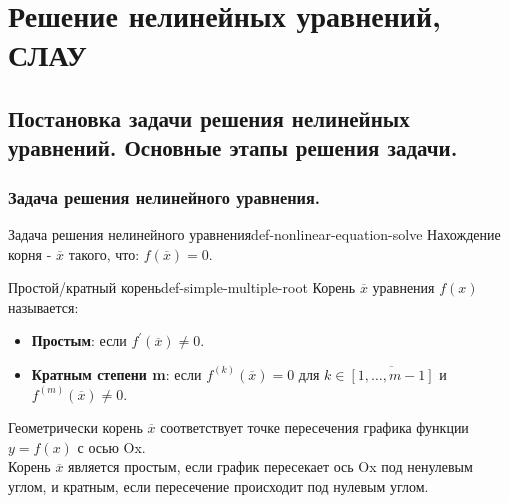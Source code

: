 \documentclass[14pt]{extarticle}
\begin{document}
\section{Решение нелинейных уравнений, СЛАУ}

\subsection{Постановка задачи решения нелинейных уравнений. Основные этапы решения задачи.}

    \subsubsection{Задача решения нелинейного уравнения.}

        \begin{definition}{Задача решения нелинейного уравнения}{def-nonlinear-equation-solve}
            Нахождение корня - $\overline{x}$ такого, что: $f(\overline{x}) = 0$.
        \end{definition}

        \begin{definition}{Простой/кратный корень}{def-simple-multiple-root}
            Корень $\overline{x}$ уравнения $f(x)$ называется:
            \begin{itemize}
                \item \textbf{Простым}: если $f^{'}(\overline{x}) \neq 0$.
                \item \textbf{Кратным степени m}: если $f^{(k)}(\overline{x}) = 0$ для $k \in \overline{[1, \ldots, m-1]}$ и $f^{(m)}(\overline{x}) \neq 0$.
            \end{itemize}
        \end{definition}

        Геометрически корень $\overline{x}$ соответствует точке пересечения графика функции $y = f(x)$ с осью Ox.\\ 
        Корень $\overline{x}$ является простым, если график пересекает ось Ox под ненулевым углом, и кратным, если пересечение происходит под нулевым углом.
\end{document}
